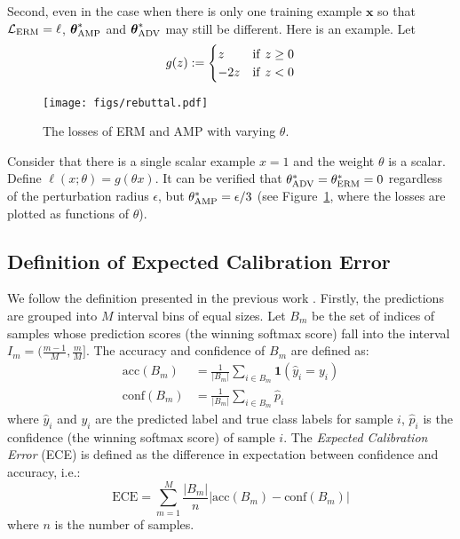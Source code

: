 \documentclass[final]{cvpr}
\begin{document}
Second, even in the case when there is only one training example $\boldsymbol{x}$ so that $\mathcal{L}_{\rm ERM}=\ell$, $\boldsymbol{\theta}^*_{\rm AMP}$ and $\boldsymbol{\theta}^*_{\rm ADV}$ may still be different. Here is an example. Let 
\begin{equation*}
g(z):=\begin{cases}
z   & {\rm if}~z\ge0\\
-2z & {\rm if}~z<0
\end{cases}
\end{equation*}

\begin{figure}[t]
\centering
\texttt{[image: figs/rebuttal.pdf]}
\caption{The losses of ERM and AMP with varying $\theta$.}
\label{fig:diff}
\end{figure}

Consider that there is a single scalar example $x=1$ and  the weight $\theta$ is a scalar. Define $\ell(x; \theta)=g(\theta x)$.  It can be verified that $\theta^*_{\rm ADV}=\theta^*_{\rm ERM}=0$ regardless of the perturbation radius $\epsilon$, but $\theta^*_{\rm AMP}=\epsilon/3$ (see Figure~\ref{fig:diff}, where the losses are plotted as functions of $\theta$).

\subsection{Definition of Expected Calibration Error}\label{app:d}

We follow the definition presented in the previous work \cite{guo2017calibration}. Firstly, the predictions are grouped into $M$ interval bins of equal sizes. Let $B_m$ be the set of indices of samples whose prediction scores (the winning softmax score) fall into the interval $I_m=(\frac{m-1}{M},\frac mM]$. The accuracy and confidence of $B_m$ are defined as:
\begin{align*}
\text{acc}(B_m)&=\frac{1}{|B_m|}\sum_{i\in B_m}\mathbf{1}(\hat{y}_i=y_i)\\
\text{conf}(B_m)&=\frac{1}{|B_m|}\sum_{i\in B_m}\hat{p}_i
\end{align*}
where $\hat{y}_i$ and $y_i$ are the predicted label and true class labels for sample $i$, $\hat{p}_i$ is the confidence (the winning softmax score) of sample $i$. The {\em Expected Calibration Error} (ECE) is defined as the difference in expectation between confidence and accuracy, i.e.:
\begin{equation*}
\text{ECE}=\sum_{m=1}^M\frac{|B_m|}{n}\bigg\vert\text{acc}(B_m)-\text{conf}(B_m)\bigg\vert
\end{equation*}
where $n$ is the number of samples.
\end{document}
